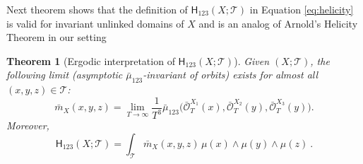 \documentclass[12pt]{article}
\newtheorem{theorem}{Theorem}[section]
\newcommand{\no}{\noindent}
\begin{document}
\no Next theorem shows that the definition of $\mathsf{H}_{123}(X;\mathcal{T})$
in Equation \eqref{eq:helicity} is valid for invariant unlinked domains of $X$ and is an analog of Arnold's Helicity Theorem in our setting

\begin{theorem}[Ergodic interpretation of $\mathsf{H}_{123}(X;\mathcal{T})$]\label{th:ergodic-mu}
 Given $(X;\mathcal{T})$, the following limit (asymptotic $\bar{\mu}_{123}$-invariant of orbits) exists for  almost 
 all $(x,y,z)\in \mathcal{T}$:
\begin{equation}\label{eq:bar-m_X}
 \bar{m}_X(x,y,z)=\lim_{T\to\infty} \frac{1}{T^3}\bar{\mu}_{123}\bigl(\bar{\mathscr{O}}^{X_1}_T(x),\bar{\mathscr{O}}^{X_2}_T(y),\bar{\mathscr{O}}^{X_3}_T(y)\bigr).
\end{equation}
Moreover, 
\begin{equation}\label{eq:H_123-ergodic}
 \mathsf{H}_{123}(X;\mathcal{T})=\int_{\mathcal{T}} \bar{m}_X(x,y,z)\,\mu(x)\wedge\mu(y)\wedge\mu(z)\ .
\end{equation}
\end{theorem}
\end{document}
